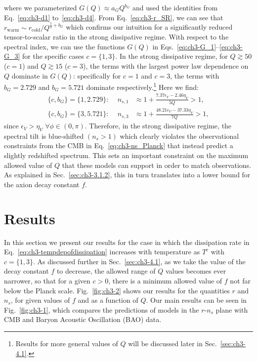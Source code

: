 where we parameterized $G(Q)\approx a_G Q^{b_G}$ and used the identities from Eq.~\ref{eq:ch3-d1} to~\ref{eq:ch3-d4}. From Eq.~\ref{eq:ch3-r_SR}, we can see that $r_{\mathrm{warm}}\sim r_{\mathrm{cold}}/ Q^{\frac{5}{2}+b_G}$ which confirms our intuition for a significantly reduced tensor-to-scalar ratio in the strong dissipative regime. With respect to the spectral index, we can use the functions $G(Q)$ in Eqs.~\ref{eq:ch3-G_1}--\ref{eq:ch3-G_3} for the specific cases $c=\{1,3\}$. In the strong dissipative regime, for $Q\gtrsim50$ ($c=1$) and $Q\gtrsim 15$ ($c=3$), the terms with the largest power law dependence on $Q$ dominate in $G(Q)$:  specifically for $c=1$ and $c=3$, the terms with $b_G = 2.729$ and $b_G=5.721$ dominate respectively.\footnote{Results for more general values of $Q$ will be discussed later in Sec.~\ref{sec:ch3-4.1}.} Here we find:
\begin{align}
    \text{$\{c,b_G\}=\{1,2.729\}$: } \quad n_{s,1}&\approx 1+ \frac{7.37\epsilon_V-2.46\eta_V}{5Q}> 1, \label{eq:ch3-ns.SR1}\\
    \text{$\{c,b_G\}=\{3,5.721\}$: } \quad n_{s,3}&\approx 1+ \frac{48.21\epsilon_V-37.33\eta_V}{7Q}> 1, \label{eq:ch3-ns.SR3}
\end{align}
since $\epsilon_V>\eta_V$ $\forall \phi\in(0,\pi)$. Therefore, in the strong dissipative regime, the spectral tilt is blue-shifted $(n_s>1)$ which clearly violates the observational constraints from the CMB in Eq.~\ref{eq:ch3-ns_Planck} that instead predict a slightly redshifted spectrum. This sets an important constraint on the maximum allowed value of $Q$ that these models can support in order to match observations. As explained in Sec.~\ref{sec:ch3-3.1.2}, this in turn translates into a lower bound for the axion decay constant $f$.

\section{Results \label{sec:ch3-results}}

In this section we present our results for the case in which the dissipation rate in Eq.~\ref{eq:ch3-tempdepofdissipation} increases with temperature as $T^c$ with $c=\{1,3\}$.  As discussed further in Sec.~\ref{sec:ch3-4.1}, as we take the value of the decay constant $f$ to decrease, the allowed range of $Q$ values becomes ever narrower, so that for a given $c>0$, there is a minimum allowed value of $f$ not far below the Planck scale. Fig.~\ref{fig:ch3-2} shows our results for the quantities $r$ and $n_s$, for given values of $f$ and as a function of $Q$. Our main results can be seen in Fig.~\ref{fig:ch3-1}, which compares the predictions of models in the $r$-$n_s$ plane with CMB and Baryon Acoustic Oscillation (BAO) data.

